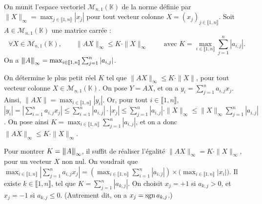 \begin{exm}
	On munit l'espace vectoriel $\mathcal{M}_{n,1}(\mathds{K})$\/ de la norme définie par $\|X\|_\infty = \max_{j \in  \llbracket 1,n \rrbracket} |x_j|$\/ pour tout vecteur colonne $X = (x_j)_{j\in\llbracket 1,n \rrbracket}$. Soit $A \in \mathcal{M}_{n,1}(\mathds{K})$\/ une matrice carrée : \[
		\forall X \in \mathcal{M}_{n,1}(\mathds{K}),\quad\quad \|AX\|_\infty \le K \cdot \|X\|_\infty \quad \quad \text{ avec } K = \max_{i \in \llbracket 1,n \rrbracket} \sum_{j=1}^n |a_{i,j}|
	.\]
	On a $\sub A_\infty = \max_{i \in \llbracket 1,n \rrbracket} \sum_{j=1}^n |a_{i,j}|$.

	On détermine le plus petit réel $K$ tel que $\|AX\|_\infty \le K \cdot \|X\|$, pour tout vecteur colonne $X \in \mathcal{M}_{n,1}(\mathds{K})$.
	On pose $Y = AX$, et on a $y_i = \sum_{j=1}^n a_{i,j} x_j$.
	Ainsi, $\|AX\| = \max_{i \in \llbracket 1,n \rrbracket} |y_i|$.
	Or, pour tout $i\in \llbracket 1,n \rrbracket$, $|y_i| = \left| \sum_{i = 1}^n a_{i,j} x_j \right| \le \sum_{i=1}^n |a_{i,j}|\cdot |x_j| \le \sum_{j=1}^n |a_{i,j}| \cdot \|X\|_\infty \le \|X\|_\infty \sum_{j=1}^n |a_{i,j}|$.
	On pose ainsi $K = \max_{i\in\llbracket 1,n\rrbracket}\sum_{j=1}^n |a_{i,j}|$, et on a donc $\| AX\|_\infty \le K \cdot \|X\|_\infty$.
	
	Pour montrer $K = \sub A_\infty$, il suffit de réaliser l'égalité $\|AX\|_\infty = K\cdot \|X\|_\infty$, pour un vecteur $X$ non nul.
	On voudrait que $\max_{i\in \llbracket 1,n\rrbracket} \left| \sum_{j=1}^n a_{i,j} x_j\right| = \left(\max_{i \in \llbracket 1,n\rrbracket} \sum_{i=1}^n |a_{i,j}|\right) \times \big(\max_{i \in \llbracket 1,n\rrbracket} |x_i|\big)$.
	Il existe $k\in\llbracket 1,n\rrbracket$, tel que $K = \sum_{j=1}^n |a_{k,j}|$.
	On choisit $x_j = +1$ si $a_{k,j} > 0$, et $x_j = -1$ si $a_{k,j} \le 0$. (Autrement dit, on a $x_j = \operatorname*{sgn} a_{k,j}$.)
\end{exm}

